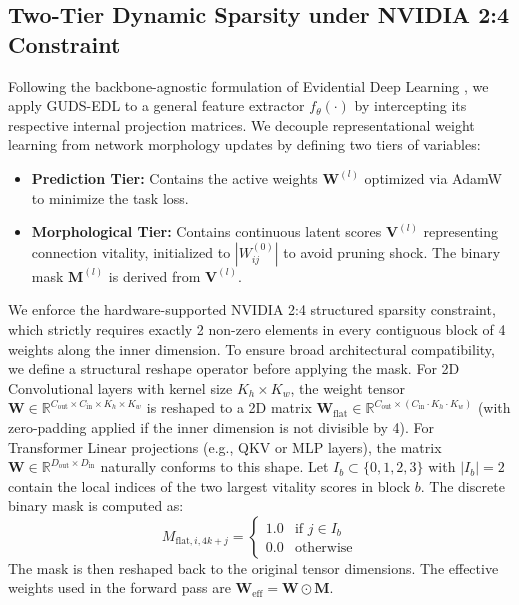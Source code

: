 \documentclass[letterpaper]{article} %
\newcommand{\R}{\mathbb{R}}
\begin{document}
\subsection{Two-Tier Dynamic Sparsity under NVIDIA 2:4 Constraint}
Following the backbone-agnostic formulation of Evidential Deep Learning \cite{sensoy2018evidential}, we apply GUDS-EDL to a general feature extractor $f_\theta(\cdot)$ by intercepting its respective internal projection matrices. We decouple representational weight learning from network morphology updates by defining two tiers of variables:
\begin{itemize}
    \item \textbf{Prediction Tier:} Contains the active weights $\bm{W}^{(l)}$ optimized via AdamW to minimize the task loss.
    \item \textbf{Morphological Tier:} Contains continuous latent scores $\bm{V}^{(l)}$ representing connection vitality, initialized to $|W_{ij}^{(0)}|$ to avoid pruning shock. The binary mask $\bm{M}^{(l)}$ is derived from $\bm{V}^{(l)}$.
\end{itemize}
We enforce the hardware-supported NVIDIA 2:4 structured sparsity constraint, which strictly requires exactly 2 non-zero elements in every contiguous block of 4 weights along the inner dimension. To ensure broad architectural compatibility, we define a structural reshape operator before applying the mask. For 2D Convolutional layers with kernel size $K_h \times K_w$, the weight tensor $\bm{W} \in \R^{C_{\text{out}} \times C_{\text{in}} \times K_h \times K_w}$ is reshaped to a 2D matrix $\bm{W}_{\text{flat}} \in \R^{C_{\text{out}} \times (C_{\text{in}} \cdot K_h \cdot K_w)}$ (with zero-padding applied if the inner dimension is not divisible by 4). For Transformer Linear projections (e.g., QKV or MLP layers), the matrix $\bm{W} \in \R^{D_{\text{out}} \times D_{\text{in}}}$ naturally conforms to this shape. Let $I_b \subset \{0, 1, 2, 3\}$ with $|I_b| = 2$ contain the local indices of the two largest vitality scores in block $b$. The discrete binary mask is computed as:
\begin{equation}\label{eq:mask}
    M_{\text{flat}, i, 4k+j} = \begin{cases}
        1.0 & \text{if } j \in I_b \\
        0.0 & \text{otherwise}
    \end{cases}
\end{equation}
The mask is then reshaped back to the original tensor dimensions. The effective weights used in the forward pass are $\bm{W}_{\text{eff}} = \bm{W} \odot \bm{M}$.
\end{document}
